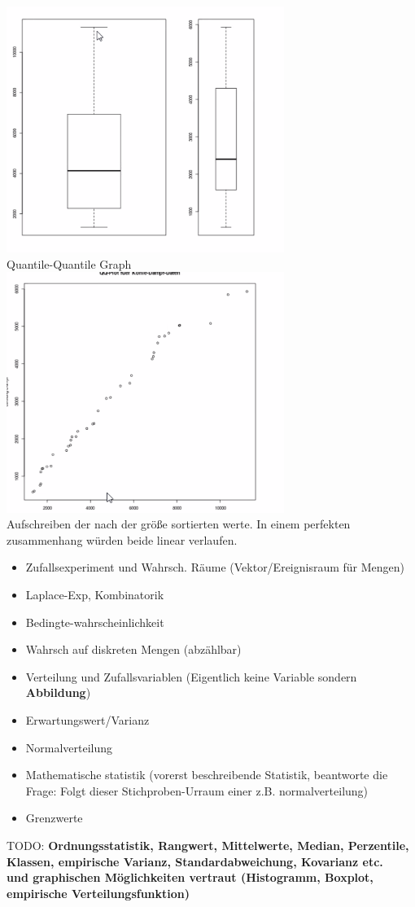 \documentclass{article}
\begin{document}
	\includegraphics[width=256pt]{kohle.png}\\
	Quantile-Quantile Graph\\
	\includegraphics[width=256pt]{QQ-plot.png}\\
	Aufschreiben der nach der größe sortierten werte. In einem perfekten zusammenhang würden beide linear verlaufen.\\
	\begin{itemize}
		\item Zufallsexperiment und Wahrsch. Räume (Vektor/Ereignisraum für Mengen)
		\item Laplace-Exp, Kombinatorik
		\item Bedingte-wahrscheinlichkeit
		\item Wahrsch auf diskreten Mengen (abzählbar)
		\item Verteilung und Zufallsvariablen (Eigentlich keine Variable sondern \textbf{Abbildung})
		\item Erwartungswert/Varianz
		\item Normalverteilung
		\item Mathematische statistik (vorerst beschreibende Statistik, beantworte die Frage: Folgt dieser Stichproben-Urraum einer z.B. normalverteilung)
		\item Grenzwerte
	\end{itemize}
	TODO: \textbf{Ordnungsstatistik,
Rangwert, Mittelwerte, Median, Perzentile, Klassen, empirische Varianz, Standardabweichung, Kovarianz etc.\\
und graphischen Möglichkeiten vertraut (Histogramm, Boxplot,
empirische Verteilungsfunktion)}
\end{document}

